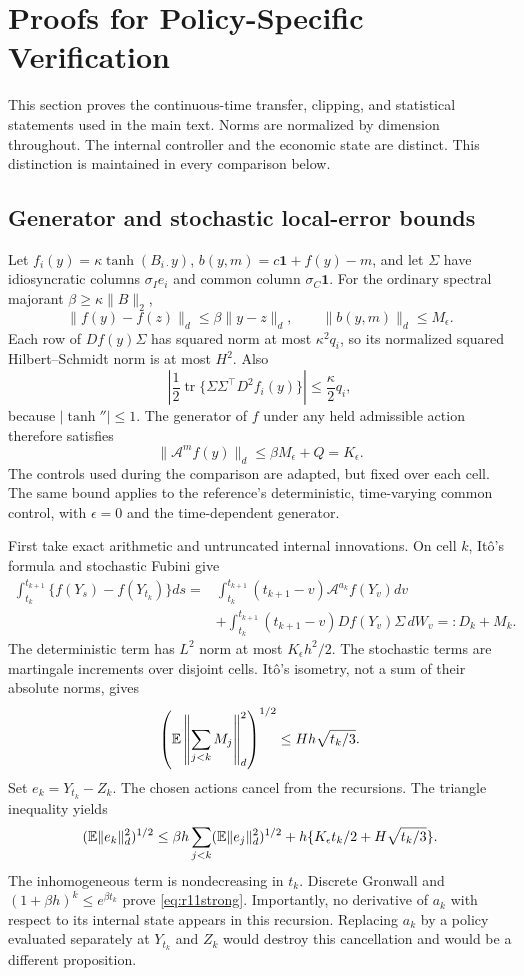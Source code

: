 \section{Proofs for Policy-Specific Verification}\label{app:r11proofs}
This section proves the continuous-time transfer, clipping, and statistical statements used in the main text. Norms are normalized by dimension throughout. The internal controller and the economic state are distinct. This distinction is maintained in every comparison below.

\subsection{Generator and stochastic local-error bounds}
Let $f_i(y)=\kappa\tanh(B_{i\cdot}y)$, $b(y,m)=c\bm1+f(y)-m$, and let $\Sigma$ have idiosyncratic columns $\sigma_I e_i$ and common column $\sigma_C\bm1$. For the ordinary spectral majorant $\beta\geq\kappa\|B\|_2$,
\[
 \|f(y)-f(z)\|_d\leq\beta\|y-z\|_d,
 \qquad \|b(y,m)\|_d\leq M_\epsilon.
\]
Each row of $D f(y)\Sigma$ has squared norm at most $\kappa^2q_i$, so its normalized squared Hilbert--Schmidt norm is at most $H^2$. Also
\[
 \left|\frac12\operatorname{tr}\{\Sigma\Sigma^\top D^2 f_i(y)\}\right|
 \leq\frac\kappa2 q_i,
\]
because $|\tanh''|\leq1$. The generator of $f$ under any held admissible action therefore satisfies
\begin{equation}\label{eq:r11generator}
 \|\mathcal A^m f(y)\|_d\leq\beta M_\epsilon+Q=K_\epsilon.
\end{equation}
The controls used during the comparison are adapted, but fixed over each cell. The same bound applies to the reference's deterministic, time-varying common control, with $\epsilon=0$ and the time-dependent generator.

First take exact arithmetic and untruncated internal innovations. On cell $k$, It\^o's formula and stochastic Fubini give
\begin{align*}
 \int_{t_k}^{t_{k+1}}\{f(Y_s)-f(Y_{t_k})\}ds
 ={}&\int_{t_k}^{t_{k+1}}(t_{k+1}-v)\mathcal A^{a_k} f(Y_v)dv\\
 &+\int_{t_k}^{t_{k+1}}(t_{k+1}-v)D f(Y_v)\Sigma\,dW_v
 =:D_k+M_k.
\end{align*}
The deterministic term has $L^2$ norm at most $K_\epsilon h^2/2$. The stochastic terms are martingale increments over disjoint cells. It\^o's isometry, not a sum of their absolute norms, gives
\[
 \left(\mathbb E\left\|\sum_{j<k}M_j\right\|_d^2\right)^{1/2}
 \leq Hh\sqrt{t_k/3}.
\]
Set $e_k=Y_{t_k}-Z_k$. The chosen actions cancel from the recursions. The triangle inequality yields
\[
 (\mathbb E\|e_k\|_d^2)^{1/2}
 \leq\beta h\sum_{j<k}(\mathbb E\|e_j\|_d^2)^{1/2}
       +h\{K_\epsilon t_k/2+H\sqrt{t_k/3}\}.
\]
The inhomogeneous term is nondecreasing in $t_k$. Discrete Gronwall and $(1+\beta h)^k\leq e^{\beta t_k}$ prove \eqref{eq:r11strong}. Importantly, no derivative of $a_k$ with respect to its internal state appears in this recursion. Replacing $a_k$ by a policy evaluated separately at $Y_{t_k}$ and $Z_k$ would destroy this cancellation and would be a different proposition.


